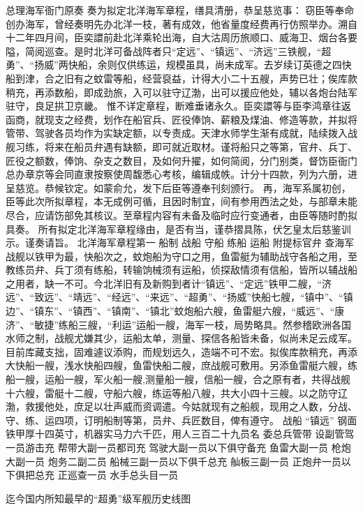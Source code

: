 \documentclass[12pt,UTF8]{ctexbook}
\begin{document}
总理海军衙门原奏
奏为拟定北洋海军章程，缮具清册，恭呈慈览事：
窃臣等奉命创办海军，曾经奏明先办北洋一枝，著有成效，他省量度经费再行仿照举办。溯自十二年四月间，臣奕譞前赴北洋乘轮出海，自大沽周历旅顺口、威海卫、烟台各要隘，简阅巡查。是时北洋可备战阵者只“定远”、“镇远”、“济远”三铁舰，“超勇”、“扬威”两快船，余则仅供练运，规模虽具，尚未成军。去岁续订英德之四快船到津，合之旧有之蚊雷等船，经营裒益，计得大小二十五艘，声势已壮；俟库款稍充，再添数船，即成劲旅，入可以驻守辽渤，出可以援应他处，辅以各炮台陆军驻守，良足拱卫京畿。
惟不详定章程，断难垂诸永久。臣奕譞等与臣李鸿章往返函商，就现支之经费，划作在船官兵、匠役俸饷、薪粮及煤油、修造等款，并拟将管带、驾驶各员均作为实缺定额，以专责成。天津水师学生渐有成就，陆续拨入战舰习练，将来在船员弁遇有缺额，即可就近取材。谨将船只之等第，官弁、兵丁、匠役之额数，俸饷、杂支之数目，及如何升擢，如何简阅，分门别类，督饬臣衙门总办章京等会同直隶按察使周馥悉心考核，编辑成帙。计分十四款，列为六册，进呈慈览。恭候钦定。如蒙俞允，发下后臣等遵奉刊刻颁行。
再，海军系属初创，臣等此次所拟章程，本无成例可循，且因时制宜，间有参用西法之处，与部章未能尽合，应请饬部免其核议。至章程内容有未备及临时应行变通者，由臣等随时酌拟具奏。
所有拟定北洋海军章程缘由，是否有当，谨恭摺具陈，伏乞皇太后慈鉴训示。谨奏请旨。
北洋海军章程第一
船制 战船 守船 练船 运船 附提标官弁
查海军战舰以铁甲为最，快船次之，蚊炮船为守口之用，鱼雷艇为辅助战守各船之用，至教练员弁、兵丁须有练船，转输饷械须有运船，侦探敌情须有信船，皆所以辅战船之用者，缺一不可。今北洋旧有及新购到者计“镇远”、“定远”铁甲二艘，“济远”、“致远”、“靖远”、“经远”、“来远”、“超勇”、“扬威”快船七艘，“镇中”、“镇边”、“镇东”、“镇西”、“镇南”、“镇北”蚊炮船六艘，鱼雷艇六艘，“威远”、“康济”、“敏捷”练船三艘，“利运”运船一艘，海军一枝，局势略具。然参稽欧洲各国水师之制，战舰尤嫌其少，运船太单，测量、探信各船皆未备，似尚未足云成军。
目前库藏支拙，固难遽议添购，而规划远久，造端不可不宏。拟俟库款稍充，再添大快船一艘，浅水快船四艘，鱼雷快船二艘，庶战舰可敷用。另添鱼雷艇六艘，练船一艘，运船一艘，军火船一艘,测量船一艘，信船一艘，合之原有者，共得战舰十六艘，雷艇十二艘，守船六艘，练运等船八艘，共大小四十三艘。以之防守辽渤，救援他处，庶足以壮声威而资调遣。今姑就现有之船舰，现用之人数，分战、守、练、运四项，订明船制等第，员弁、兵匠数目，俾有遵守。
战船
“镇远”
钢面铁甲厚十四英寸，机器实马力六千匹，用人三百二十九员名
委总兵管带
设副管驾一员游击充
帮带大副一员都司充
驾驶大副一员以下俱守备充
鱼雷大副一员
枪炮大副一员
炮务二副二员
船械三副一员以下俱千总充
舢板三副一员
正炮弁一员以下俱把总充
正巡查一员
水手总头目一员




迄今国内所知最早的“超勇”级军舰历史线图
\end{document}
